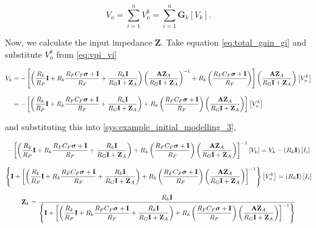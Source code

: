 \begin{equation} V_o = \sum_{i=1}^n V_o^k = \sum_{i=1}^n \mathbf{G}_k \left[V_k\right] .\label{eq:vo_sum} \end{equation}

	Now, we calculate the input impedance $\mathbf{Z}$. Take equation \eqref{eq:total_gain_gi} and substitute $V_o^k$ from \eqref{eq:vpi_vi}

\begin{align}
	V_k &= -\left[\left(\dfrac{R_k}{R_P}\mathbf{I} + R_k\dfrac{R_FC_F \boldsymbol{\sigma} + \mathbf{I}}{R_F} + \dfrac{R_k\mathbf{I}}{R_G\mathbf{I} + \mathbf{Z}_A}\right)\left(\dfrac{\mathbf{A}\mathbf{Z}_A}{R_G\mathbf{I} + \mathbf{Z}_A}\right)^{-1} + R_k\left(\dfrac{R_FC_F \boldsymbol{\sigma} + \mathbf{I}}{R_F}\right)\right]\left(\dfrac{\mathbf{A}\mathbf{Z}_A}{R_G\mathbf{I} + \mathbf{Z}_A}\right) \left[V_n^k\right] \nonumber\\[3mm]
	&= -\left[\left(\dfrac{R_k}{R_P}\mathbf{I} + R_k\dfrac{R_FC_F \boldsymbol{\sigma} + \mathbf{I}}{R_F} + \dfrac{R_k\mathbf{I}}{R_G\mathbf{I} + \mathbf{Z}_A}\right) + R_k\left(\dfrac{R_FC_F \boldsymbol{\sigma} + \mathbf{I}}{R_F}\right)\left(\dfrac{\mathbf{A}\mathbf{Z}_A}{R_G\mathbf{I} + \mathbf{Z}_A}\right)\right] \left[V_n^k\right]
\end{align}

	\noindent and substituting this into \eqref{sys:example_initial_modelling_3},

\begin{gather}
	-\left[\left(\dfrac{R_k}{R_P}\mathbf{I} + R_k\dfrac{R_FC_F \dpo + \mathbf{I}}{R_F} + \dfrac{R_k\mathbf{I}}{R_G\mathbf{I} + \mathbf{Z}_A}\right) + R_k\left(\dfrac{R_FC_F \dpo + \mathbf{I}}{R_F}\right)\left(\dfrac{\mathbf{A}\mathbf{Z}_A}{R_G\mathbf{I} + \mathbf{Z}_A}\right)\right]^{-1} \left[V_k\right] = V_k - \left(R_k\mathbf{I}\right) \left[I_i\right] \nonumber\\[3mm]
%
	\left\{\mathbf{I} + \left[\left(\dfrac{R_k}{R_P}\mathbf{I} + R_k\dfrac{R_FC_F \dpo + \mathbf{I}}{R_F} + \dfrac{R_k\mathbf{I}}{R_G\mathbf{I} + \mathbf{Z}_A}\right) + R_k\left(\dfrac{R_FC_F \dpo + \mathbf{I}}{R_F}\right)\left(\dfrac{\mathbf{A}\mathbf{Z}_A}{R_G\mathbf{I} + \mathbf{Z}_A}\right)\right]^{-1}\right\} \left[V_n^k\right] = \left(R_k\mathbf{I}\right) \left[I_i\right] \nonumber\\[3mm]
%
	\mathbf{Z}_k = \dfrac{R_k\mathbf{I}}{\left\{\mathbf{I} + \left[\left(\dfrac{R_k}{R_P}\mathbf{I} + R_k\dfrac{R_FC_F \dpo + \mathbf{I}}{R_F} + \dfrac{R_k\mathbf{I}}{R_G\mathbf{I} + \mathbf{Z}_A}\right) + R_k\left(\dfrac{R_FC_F \dpo + \mathbf{I}}{R_F}\right)\left(\dfrac{\mathbf{A}\mathbf{Z}_A}{R_G\mathbf{I} + \mathbf{Z}_A}\right)\right]^{-1}\right\}}
\end{gather}

